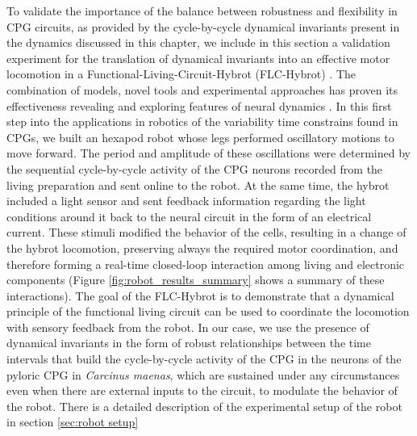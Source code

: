 To validate the importance of the balance between robustness and flexibility in  CPG circuits, as provided by the cycle-by-cycle dynamical invariants present in the dynamics discussed in this chapter, we include in this section a validation experiment for the translation of dynamical invariants into an effective motor locomotion in a Functional-Living-Circuit-Hybrot (FLC-Hybrot) \textcite{amaducci_hybrid_2020,amaducci_controlling_2021,soetard_dynamical_2023}. The combination of models, novel tools and experimental approaches has proven its effectiveness revealing and exploring features of neural dynamics \parencite{szucs_interacting_2000,chamorro_generalization_2012,reyes-sanchez_automatized_2023}. In this first step into the applications in robotics of the variability time constrains found in CPGs, we built an hexapod robot whose legs performed oscillatory motions to move forward. The period and amplitude of these oscillations were determined by the sequential cycle-by-cycle activity of the CPG neurons recorded from the living preparation and sent online to the robot. At the same time, the hybrot included a light sensor and sent feedback information regarding the light conditions around it back to the neural circuit in the form of an electrical current. These stimuli modified the behavior of the cells, resulting in a change of the hybrot locomotion, preserving always the required motor coordination, and therefore forming a real-time closed-loop interaction among living and electronic components (Figure \ref{fig:robot_results_summary} shows a summary of these interactions). The goal of the FLC-Hybrot is to demonstrate that a dynamical principle of the functional living circuit can be used to coordinate the locomotion with sensory feedback from the robot. In our case, we use the presence of dynamical invariants in the form of robust relationships between the time intervals that build the cycle-by-cycle activity of the CPG in the neurons of the pyloric CPG in \textit{Carcinus maenas}, which are sustained under any circumstances even when there are external inputs to the circuit, to modulate the behavior of the robot. There is a detailed description of the experimental setup of the robot in section \ref{sec:robot setup}

